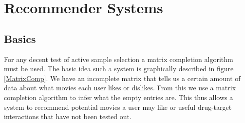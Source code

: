\newcommand\setrow[9]{
  \setcounter{col}{1}
  \foreach \n in {#1, #2, #3, #4, #5, #6, #7, #8, #9} {
    \edef\x{\value{col} - 0.5}
    \edef\y{9.5 - \value{row}}
    \node[anchor=center] at (\x, \y) {\n};
    \stepcounter{col}
  }
  \stepcounter{row}
}
\chapter{Recommender Systems}
\ifpdf
    \graphicspath{{Chapter1/Chapter1Figs/PN1G/}{Chapter1/Chapter1Figs/PDF/}{Chapter1/Chapter1Figs/}}
\else
    \graphicspath{{Chapter1/Chapter1Figs/EPS/}{Chapter1/Chapter1Figs/}}
\fi
{}
\section{Basics}
For any decent test of active sample selection a matrix completion algorithm must be used. The basic idea such a system is graphically described in figure \ref{MatrixComp}. We have an incomplete matrix that tells us a certain amount of data about what movies each user likes or dislikes. From this we use a matrix completion algorithm to infer what the empty entries are. This thus allows a system to recommend potential movies a user may like or useful drug-target interactions that have not been tested out.
